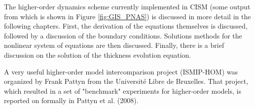 The higher-order dynamics scheme currently implemented in CISM (some output from which is shown in Figure \ref{fig:GIS_PNAS}) is discussed in more detail in the following chapters. First, the derivation of the equations themselves is discussed, followed by a discussion of the boundary conditions. Solutions methods for the nonlinear system of equations are then discussed. Finally, there is a brief discussion on the solution of the thickness evolution equation. 

A very useful higher-order model intercomparison project (ISMIP-HOM) was organized by Frank Pattyn from the Université Libre de Bruxelles. That project, which resulted in a set of "benchmark" experiments for higher-order models, is reported on formally in Pattyn et al. (2008). 

%